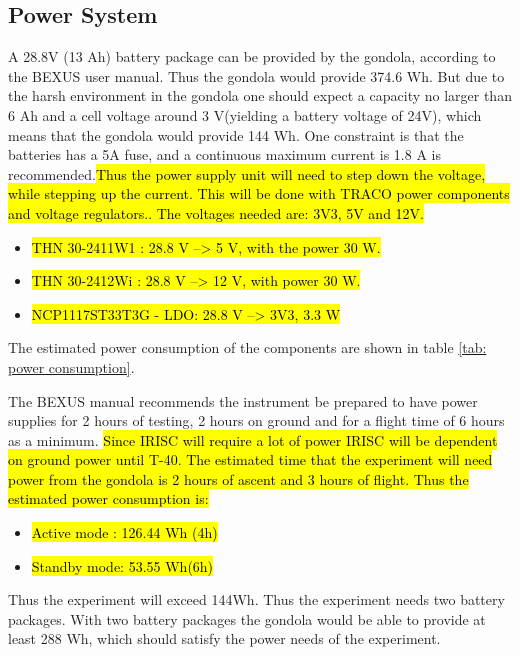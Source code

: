 \pagebreak
\subsection{Power System}

\label{sec:4.7}

A 28.8V (13 Ah) battery package can be provided by the gondola, according to the BEXUS user manual. Thus the gondola would provide 374.6 Wh. But due to the harsh environment in the gondola one should expect a capacity no larger than 6 Ah and a cell voltage around 3 V(yielding a battery voltage of 24V), which means that the gondola would provide 144 Wh. One constraint is that the batteries has a 5A fuse, and a continuous maximum current is 1.8 A is recommended.\hl{Thus the power supply unit will need to step down the voltage, while stepping up the current. This will be done with TRACO power components and voltage regulators.. The voltages needed are: 3V3, 5V and 12V.}

\begin{itemize}
	\item \hl{ THN 30-2411W1 : 28.8 V --> 5 V, with the power 30 W.}
	\item \hl{THN 30-2412Wi : 28.8 V --> 12 V, with power 30 W.}
	\item \hl{NCP1117ST33T3G - LDO: 28.8 V --> 3V3, 3.3 W}
\end{itemize}


The estimated power consumption of the components are shown in table \ref{tab: power consumption}.



The BEXUS manual recommends the instrument be prepared to have power supplies for 2 hours of testing, 2 hours on ground and for a flight time of 6 hours as a minimum. \hl{Since IRISC will require a lot of power IRISC will be dependent on ground power  until T-40. The estimated time that the experiment will need power from the gondola is 2 hours of ascent and 3 hours of flight. Thus the estimated power consumption is:  }

\begin{itemize}
    \item \hl{Active mode : 126.44 Wh (4h) }
    \item \hl{Standby mode: 53.55 Wh(6h)}
\end{itemize}

Thus the experiment will exceed 144Wh. Thus the experiment needs two battery packages. With two battery packages the gondola would be able to provide at least 288 Wh, which should satisfy the power needs of the experiment.



\raggedbottom
